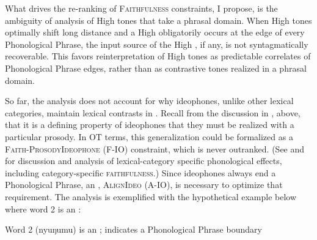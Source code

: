 \documentclass[output=paper,newtxmath,modfonts,nonflat,hidelinks]{langsci/langscibook}
\begin{document}
What drives the re-ranking of \textsc{Faithfulness} constraints, I propose, is the ambiguity of analysis of High tones that take a phrasal domain. When High tones optimally shift long distance and a High  obligatorily occurs at the edge of every Phonological Phrase, the input source of the High , if any, is not syntagmatically recoverable. This favors reinterpretation of High tones as predictable correlates of Phonological Phrase edges, rather than as contrastive tones realized in a phrasal domain.

\largerpage
So far, the analysis does not account for why ideophones, unlike other lexical categories, maintain lexical  contrasts in . Recall from the discussion in , above, that it is a defining property of ideophones that they must be realized with a particular prosody. In OT terms, this generalization could be formalized as a \textsc{Faith-ProsodyIdeophone} (\textsc{F-IO}) constraint, which is never outranked. (See \citealt{Shih&Inkelas2015} and \citealt{Smith2011} for discussion and analysis of lexical-category specific phonological effects, including category-specific \textsc{faithfulness}.) Since ideophones always end a Phonological Phrase, an , \textsc{AlignIdeo} (\textsc{A-IO}), is necessary to optimize that requirement. The analysis is exemplified with the hypothetical example below where word 2 is an :


\ea\label{ex:downing:25}  Word 2 (nyuŋumu) is an ; {\textbar} indicates a Phonological   Phrase boundary

\footnotesize
{}
\z
\normalsize
\end{document}
